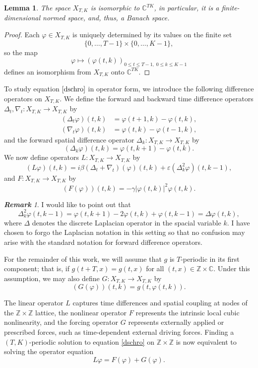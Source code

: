 \documentclass[12 pt,twoside]{amsart}
\newcommand{\C}{\mathbb{C}}
\newcommand{\Z}{\mathbb{Z}}
\newcommand{\be}{\begin{equation}}
\newcommand{\ee}{\end{equation}}
\newcommand{\bes}{\begin{equation*}}
\newcommand{\ees}{\end{equation*}}
\newcommand{\ve}{\varepsilon}
\renewcommand{\phi}{\varphi}
\numberwithin{equation}{section}
\newtheorem{lemma}[theorem]{Lemma}
\theoremstyle{definition}
\theoremstyle{remark}
\newtheorem{remark}[theorem]{\bf Remark}
\begin{document}
\begin{lemma}
The space $X_{T,K}$ is isomorphic to $\C^{TK}$, in particular, it is a finite-dimensional normed space, and, thus, a Banach space.
\end{lemma}

\begin{proof}
Each $\phi\in X_{T,K}$ is uniquely determined by its values on the finite set
\bes
\{0,\dots,T-1\}\times \{0,\dots,K-1\},
\ees
so the map
\bes
\phi\mapsto (\phi(t,k))_{0\leq t\leq T-1,\;0\leq k\leq K-1}
\ees
defines an isomorphism from $X_{T,K}$ onto $\C^{TK}$.
\end{proof}
 
To study equation $\eqref{dschro}$ in operator form, we introduce the following difference operators on $X_{T,K}$. We define the forward and backward time difference operators $\Delta_t,\nabla_t : X_{T,K}\to X_{T,K}$ by
\be
\begin{aligned}
(\Delta_t \phi)(t,k) &= \phi(t+1,k)-\phi(t,k), \\
(\nabla_t \phi)(t,k) &= \phi(t,k)-\phi(t-1,k),
\end{aligned}
\ee
and the forward spatial difference operator $\Delta_k : X_{T,K}\to X_{T,K}$ by
\begin{equation}
(\Delta_k \phi)(t,k) = \phi(t,k+1)-\phi(t,k).
\end{equation}
We now define operators
 $L\colon X_{T,K}\to X_{T,K}$  by
\be\label{linop}
(L\phi)(t,k)=i\beta(\Delta_t+\nabla_t)(\phi)(t,k)+\ve(\Delta^2_k\phi)(t,k-1),
\ee
and
 $F\colon X_{T,K}\to X_{T,K}$  by
\be\label{cubicop}
(F(\phi))(t,k)=-\gamma|\phi(t,k)|^2\phi(t,k).
\ee
\begin{remark}
I would like to point out that
\bes
\Delta_k^2\phi(t,k-1)
=
\phi(t,k+1)-2\phi(t,k)+\phi(t,k-1)=\Delta\phi(t,k),
\ees
where $\Delta$ denotes the discrete Laplacian operator in the spacial variable $k$.  I have chosen to forgo the Laplacian notation in this setting so that no confusion may arise with the standard notation for forward difference operators.
\end{remark}

For the remainder of this work, we will assume that $g$ is $T$-periodic in its first component; that is, if $g(t+T,x)=g(t,x)$ for all $(t,x)\in \Z\times \C$.  Under this assumption, we may also define 
 $G\colon X_{T,K}\to X_{T,K}$  by
\be\label{nemop}
(G(\phi))(t,k)=g(t,\phi(t,k)).
\ee


The linear operator $L$ captures time differences and spatial coupling at nodes of the $\Z\times \Z$ lattice, the nonlinear operator 
$F$ represents the intrinsic local cubic nonlinearity, and the forcing operator $G$ represents externally applied or prescribed forces, such as time-dependent external driving forces. Finding a $(T,K)$-periodic solution to equation \eqref{dschro} on $\Z\times \Z$ is now equivalent to solving the operator equation 
\be\label{banschro}
L\phi=F(\phi)+G(\phi).
\ee
\end{document}
